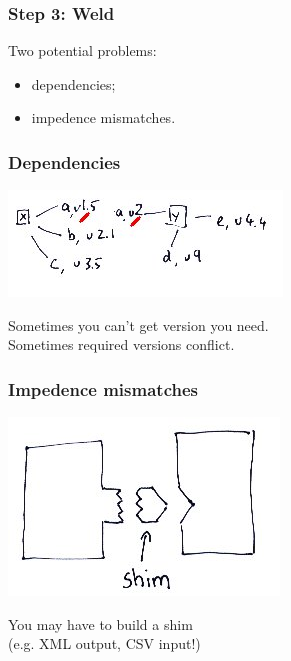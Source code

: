 \begin{frame}
\frametitle{Step 3: Weld}
\begin{changemargin}{2cm}
\Large
Two potential problems:
\begin{itemize}
\item dependencies;
\item impedence mismatches.
\end{itemize}
\end{changemargin}
\end{frame}

\begin{frame}
\frametitle{Dependencies}

\begin{center}
\includegraphics[width=.8\textwidth]{images/dependencies}
\end{center}

\begin{changemargin}{1.5cm}
\Large
Sometimes you can't get version you need.\\[1em]
Sometimes required versions conflict.
\end{changemargin}

\end{frame}

\begin{frame}
\frametitle{Impedence mismatches}

\begin{center}
\includegraphics[width=.7\textwidth]{images/shim}
\end{center}

\begin{changemargin}{2cm}
\Large
\item You may have to build a shim\\ \qquad (e.g. XML output, CSV input!)
\end{changemargin}

\end{frame}

